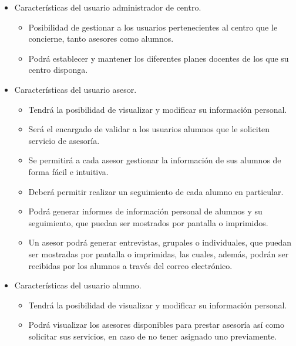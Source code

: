 \begin{itemize}
   \item Características del usuario administrador de centro.
      \begin{itemize}
       \item Posibilidad de gestionar a los usuarios pertenecientes al centro
             que le concierne, tanto asesores como alumnos.
       \item Podrá establecer y mantener los diferentes planes docentes de los
             que su centro disponga.
      \end{itemize}


   \item Características del usuario asesor.
      \begin{itemize}
         \item Tendrá la posibilidad de visualizar y modificar su información
         personal.
         \item Será el encargado de validar a los usuarios alumnos que le
         soliciten servicio de asesoría.
         \item Se permitirá a cada asesor gestionar la información de sus
         alumnos de forma fácil e intuitiva.
         \item Deberá permitir realizar un seguimiento de cada alumno en
         particular.
         \item Podrá generar informes de información personal de alumnos y su
         seguimiento, que puedan ser mostrados por pantalla o imprimidos.
         \item Un asesor podrá generar entrevistas, grupales o individuales, que
         puedan ser mostradas por pantalla o imprimidas, las cuales, además,
         podrán ser recibidas por los alumnos a través del correo electrónico.
      \end{itemize}

   \item Características del usuario alumno.
      \begin{itemize}
         \item Tendrá la posibilidad de visualizar y modificar su información
         personal.
         \item Podrá visualizar los asesores disponibles para prestar asesoría
         así como solicitar sus servicios, en caso de no tener asignado uno
         previamente.
      \end{itemize}
\end{itemize}

